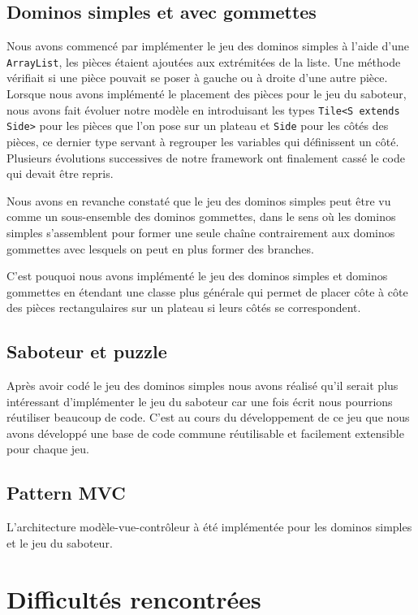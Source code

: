 \documentclass[a4paper, 11pt, DIV=9]{scrartcl}
\begin{document}
\subsection{Dominos simples et avec gommettes}
Nous avons commencé par implémenter le jeu des dominos simples à l'aide d'une
\texttt{ArrayList}, les pièces étaient ajoutées aux extrémitées de la liste. Une
méthode vérifiait si une pièce pouvait se poser à gauche ou à droite d'une autre
pièce. Lorsque nous avons implémenté le placement des pièces pour le jeu du
saboteur, nous avons fait évoluer notre modèle en introduisant les types \texttt{Tile<S
extends Side>} pour les pièces que l'on pose sur un plateau et \texttt{Side}
pour les côtés des pièces, ce dernier type servant à regrouper les variables qui
définissent un côté. Plusieurs évolutions successives de notre framework ont
finalement cassé le code qui devait être repris.

Nous avons en revanche constaté que le jeu des dominos simples peut être vu
comme un sous-ensemble des dominos gommettes, dans le sens où les dominos
simples s'assemblent pour former une seule chaîne contrairement aux dominos
gommettes avec lesquels on peut en plus former des branches.

C'est pouquoi nous avons implémenté le jeu des dominos simples et dominos
gommettes en étendant une classe plus générale qui permet de placer côte à côte
des pièces rectangulaires sur un plateau si leurs côtés se correspondent.

%


\subsection{Saboteur et puzzle}

Après avoir codé le jeu des dominos simples nous avons réalisé qu'il serait plus
intéressant d'implémenter le jeu du saboteur car une fois écrit nous pourrions
réutiliser beaucoup de code. C'est au cours du développement de ce jeu que nous
avons développé une base de code commune réutilisable et facilement extensible
pour chaque jeu.

\subsection{Pattern MVC}

L'architecture modèle-vue-contrôleur à été implémentée pour les dominos simples
et le jeu du saboteur.

\section{Difficultés rencontrées}
\end{document}
